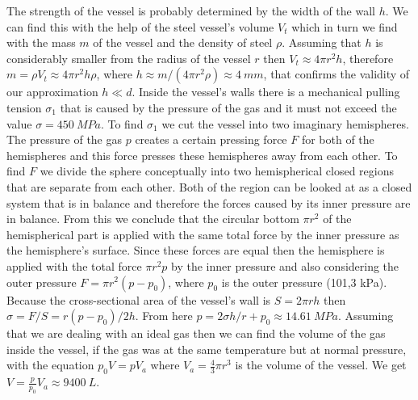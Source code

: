 \documentclass[11pt]{article}
\begin{document}
\solueng
The strength of the vessel is probably determined by the width of the wall $h$. We can find this with the help of the steel vessel’s volume $V_t$ which in turn we find with the mass $m$ of the vessel and the density of steel $\rho$. Assuming that $h$ is considerably smaller from the radius of the vessel $r$ then $V_t\approx4\pi r^2 h$, therefore $m=\rho V_t \approx 4\pi r^2h\rho$, where $h\approx m/(4\pi r^2\rho)\approx \SI{4}{mm}$, that confirms the validity of our approximation $h\ll d$. Inside the vessel’s walls there is a mechanical pulling tension $\sigma_1$ that is caused by the pressure of the gas and it must not exceed the value $\sigma=\SI{450}{MPa}$. To find $\sigma_1$ we cut the vessel into two imaginary hemispheres. The pressure of the gas $p$ creates a certain pressing force $F$ for both of the hemispheres and this force presses these hemispheres away from each other. To find $F$ we divide the sphere conceptually into two hemispherical closed regions that are separate from each other. Both of the region can be looked at as a closed system that is in balance and therefore the forces caused by its inner pressure are in balance. From this we conclude that the circular bottom $\pi r^2$ of the hemispherical part is applied with the same total force by the inner pressure as the hemisphere’s surface. Since these forces are equal then the hemisphere is applied with the total force $\pi r^2 p$ by the inner pressure and also considering the outer pressure $F=\pi r^2(p-p_0)$, where $p_0$ is the outer pressure (101,3 kPa). Because the cross-sectional area of the vessel’s wall is $S=2\pi rh$ then $\sigma=F/S=r(p-p_0)/2h$. From here $p=2\sigma h/r+p_0\approx \SI{14.61}{MPa}$. Assuming that we are dealing with an ideal gas then we can find the volume of the gas inside the vessel, if the gas was at the same temperature but at normal pressure, with the equation $p_0V=pV_a$ where $V_a=\frac{4}{3}\pi r^3$ is the volume of the vessel. We get $V=\frac{p}{p_0}V_a\approx\SI{9400}{L}$.
\probend
\bigskip

\end{document}
